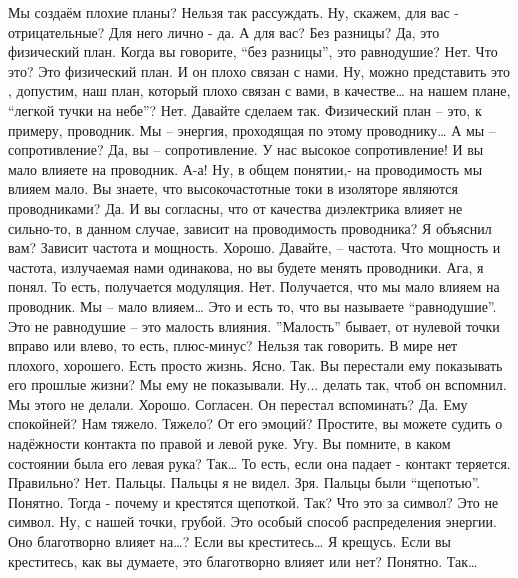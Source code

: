 \documentclass{extbook}
\newcommand{\soul}[1]{{#1}}
\newcommand{\people}[1]{{#1}}
\begin{document}
{\people{ Мы создаём плохие планы?}
\soul{Нельзя так рассуждать.}
\people{Ну, скажем, для вас - отрицательные?}
\soul{Для него лично - да. }
\people{А для  вас? Без разницы?}
\soul{Да, это физический план.}
\people{Когда вы говорите, ``без разницы'', это равнодушие?}
\soul{Нет.}
\people{Что это?}
\soul{Это физический план. И он плохо связан с нами.}
\people{Ну, можно представить это , допустим,  наш план, который плохо связан с вами, в качестве… на нашем плане, ``легкой  тучки на небе''?}
\soul{Нет. Давайте сделаем так. Физический план – это, к примеру, проводник.   Мы – энергия, проходящая по этому проводнику…}
\people{А мы – сопротивление? }
\soul{Да, вы – сопротивление.}
\people{У нас высокое сопротивление!}
\soul{И вы мало влияете на проводник. }
\people{А-а! Ну, в общем понятии,- на проводимость мы влияем мало.}
\soul{Вы знаете, что  высокочастотные токи в изоляторе являются проводниками?}
\people{Да. }
\soul{И вы согласны, что от качества диэлектрика влияет не сильно-то, в данном случае, зависит на проводимость проводника? Я объяснил вам?}
\people{Зависит частота и мощность.}
\soul{Хорошо. Давайте, – частота.  Что мощность и частота, излучаемая  нами  одинакова, но вы  будете менять проводники.}
\people{Ага,  я понял. То есть,  получается модуляция.}
\soul{Нет. Получается, что мы мало влияем на проводник. }
\people{Мы – мало влияем…}
\soul{Это и есть то, что вы  называете ``равнодушие''. Это не равнодушие – это малость влияния.}
\people{''Малость'' бывает, от нулевой точки  вправо или влево,  то есть, плюс-минус?}
\soul{Нельзя так говорить. В мире нет плохого, хорошего. Есть просто жизнь. }
\people{Ясно. Так. Вы перестали ему показывать его прошлые жизни?}
\soul{Мы ему не показывали.}
\people{Ну...  делать так, чтоб он вспомнил.}
\soul{Мы этого не делали. }
\people{Хорошо. Согласен. Он перестал вспоминать?}
\soul{Да.}
\people{Ему спокойней? }
\soul{Нам тяжело.}
\people{Тяжело? От его эмоций?}
\soul{Простите, вы можете судить о надёжности контакта по правой и левой руке. }
\people{Угу.}
\soul{Вы помните, в каком состоянии была его левая рука?}
\people{Так… То есть,  если она падает - контакт теряется. Правильно?}
\soul{Нет. Пальцы.}
\people{Пальцы я не видел.}
\soul{ Зря. Пальцы были ``щепотью''. }
\people{Понятно. Тогда - почему и крестятся щепоткой.  Так? Что это за символ?}
\soul{Это не символ. }
\people{Ну, с нашей точки, грубой.}
\soul{Это особый способ распределения энергии.}
\people{Оно благотворно влияет на…?}
\soul{Если вы креститесь…}
\people{Я крещусь.}
\soul{Если вы креститесь, как вы думаете, это благотворно влияет или нет?}
\people{Понятно. Так…}
}
\end{document}
